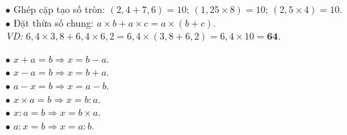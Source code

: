 \documentclass[14pt,a4paper,oneside]{extbook}
\begin{document}
\noindent
\begin{minipage}[t]{0.52\textwidth}
  \begin{tcolorbox}[
    enhanced,
    title={\footnotesize\bfseries\color{white}\faBolt\ 2. Kỹ thuật ghép số tính nhanh},
    colback=teal!2!white,
    colframe=teal!75!black,
    arc=2.5mm, boxrule=0.8pt, top=1.8mm, bottom=1.8mm, left=2.2mm, right=2.2mm
  ]
    \footnotesize
    $\bullet$ Ghép cặp tạo số tròn: $(2,4 + 7,6) = 10$; $(1,25 \times 8) = 10$; $(2,5 \times 4) = 10$.\\
    $\bullet$ Đặt thừa số chung: $a \times b + a \times c = a \times (b + c)$.\\
    \textit{VD:} $6,4 \times 3,8 + 6,4 \times 6,2 = 6,4 \times (3,8 + 6,2) = 6,4 \times 10 = \mathbf{64}$.
  \end{tcolorbox}
\end{minipage}%
\hfill
\begin{minipage}[t]{0.46\textwidth}
  \begin{tcolorbox}[
    enhanced,
    title={\footnotesize\bfseries\color{white}\faSearch\ 3. Tìm thành phần chưa biết},
    colback=purple!2!white,
    colframe=purple!70!black,
    arc=2.5mm, boxrule=0.8pt, top=1.8mm, bottom=1.8mm, left=2mm, right=2mm
  ]
    \footnotesize
    $\bullet$ $x + a = b \Rightarrow x = b - a$.\\
    $\bullet$ $x - a = b \Rightarrow x = b + a$.\\
    $\bullet$ $a - x = b \Rightarrow x = a - b$.\\
    $\bullet$ $x \times a = b \Rightarrow x = b : a$.\\
    $\bullet$ $x : a = b \Rightarrow x = b \times a$.\\
    $\bullet$ $a : x = b \Rightarrow x = a : b$.
  \end{tcolorbox}
\end{minipage}

\vspace{3mm}
\end{document}
